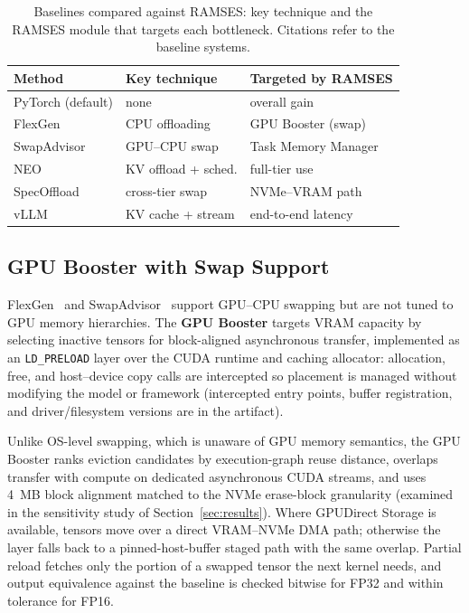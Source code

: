 \begin{table}[t]
\centering
\renewcommand{\arraystretch}{1.05}
\caption{Baselines compared against RAMSES: key technique and the RAMSES module that targets each bottleneck. Citations refer to the baseline systems.}
\label{tab:baseline_comparison}
\footnotesize
\setlength{\tabcolsep}{3pt}
\begin{tabular}{@{}p{1.95cm}p{2.5cm}p{3.1cm}@{}}
\toprule
\textbf{Method} & \textbf{Key technique} & \textbf{Targeted by RAMSES} \\
\midrule
PyTorch (default) & none & overall gain \\
FlexGen~\cite{sheng2023flexgen} & CPU offloading & GPU Booster (swap) \\
SwapAdvisor~\cite{swapAdvisor2020} & GPU--CPU swap & Task Memory Manager \\
NEO~\cite{jiang2024neo} & KV offload + sched. & full-tier use \\
SpecOffload~\cite{zhuge2025specoffload} & cross-tier swap & NVMe--VRAM path \\
vLLM~\cite{kwon2023pagedattention} & KV cache + stream & end-to-end latency \\
\bottomrule
\end{tabular}
\end{table}

\subsection{GPU Booster with Swap Support}
FlexGen~\cite{sheng2023flexgen} and SwapAdvisor~\cite{swapAdvisor2020} support GPU--CPU swapping but are not tuned to GPU memory hierarchies. The \textbf{GPU Booster} targets VRAM capacity by selecting inactive tensors for block-aligned asynchronous transfer, implemented as an \texttt{LD\_PRELOAD} layer over the CUDA runtime and caching allocator: allocation, free, and host--device copy calls are intercepted so placement is managed without modifying the model or framework (intercepted entry points, buffer registration, and driver/filesystem versions are in the artifact).

Unlike OS-level swapping, which is unaware of GPU memory semantics, the GPU Booster ranks eviction candidates by execution-graph reuse distance, overlaps transfer with compute on dedicated asynchronous CUDA streams, and uses 4~MB block alignment matched to the NVMe erase-block granularity (examined in the sensitivity study of Section~\ref{sec:results}). Where GPUDirect Storage is available, tensors move over a direct VRAM--NVMe DMA path; otherwise the layer falls back to a pinned-host-buffer staged path with the same overlap. Partial reload fetches only the portion of a swapped tensor the next kernel needs, and output equivalence against the baseline is checked bitwise for FP32 and within tolerance for FP16.


